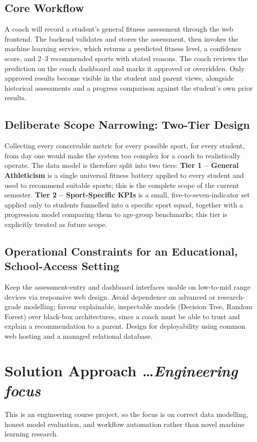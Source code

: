 \documentclass[11pt,a4paper]{article}
\newcommand{\BvrHint}[1]{%
  {\normalfont\normalsize\itshape\hfill #1}}
\begin{document}
\subsection{Core Workflow}
A coach will record a student's general fitness assessment
through the web frontend. The backend validates and stores
the assessment, then invokes the machine learning service,
which returns a predicted fitness level, a confidence
score, and 2--3 recommended sports with stated reasons. The
coach reviews the prediction on the coach dashboard and
marks it approved or overridden. Only approved results
become visible in the student and parent views, alongside
historical assessments and a progress comparison against
the student's own prior results.

\subsection{Deliberate Scope Narrowing: Two-Tier Design}
Collecting every conceivable metric for every possible
sport, for every student, from day one would make the
system too complex for a coach to realistically operate.
The data model is therefore split into two tiers:
\textbf{Tier 1 -- General Athleticism} is a single universal
fitness battery applied to every student and used to
recommend suitable sports; this is the complete scope of
the current semester. \textbf{Tier 2 -- Sport-Specific
KPIs} is a small, five-to-seven-indicator set applied only
to students funnelled into a specific sport squad, together
with a progression model comparing them to age-group
benchmarks; this tier is explicitly treated as future
scope.

\subsection{Operational Constraints for an Educational, School-Access Setting}
Keep the assessment-entry and dashboard interfaces usable
on low-to-mid range devices via responsive web design.
Avoid dependence on advanced or research-grade modelling;
favour explainable, inspectable models (Decision Tree,
Random Forest) over black-box architectures, since a coach
must be able to trust and explain a recommendation to a
parent. Design for deployability using common web hosting
and a managed relational database.

\section{Solution Approach %
\BvrHint{\ldots Engineering focus}}
This is an engineering course project, so the focus is on
correct data modelling, honest model evaluation, and
workflow automation rather than novel machine learning
research.
\end{document}
